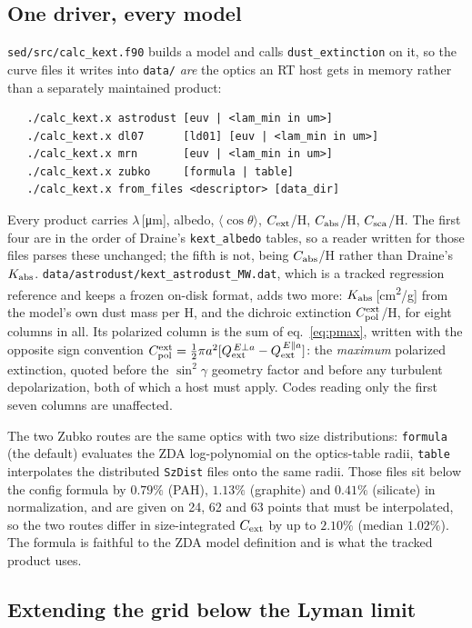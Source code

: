 \documentclass{my_memo}
\newcommand{\Qext}{\ensuremath{Q_{\rm ext}}}
\begin{document}
\subsection{One driver, every model}

\texttt{sed/src/calc\_kext.f90} builds a model and calls
\texttt{dust\_extinction} on it, so the curve files it writes into
\texttt{data/} \emph{are} the optics an RT host gets in memory rather
than a separately maintained product:
\begin{verbatim}
   ./calc_kext.x astrodust [euv | <lam_min in um>]
   ./calc_kext.x dl07      [ld01] [euv | <lam_min in um>]
   ./calc_kext.x mrn       [euv | <lam_min in um>]
   ./calc_kext.x zubko     [formula | table]
   ./calc_kext.x from_files <descriptor> [data_dir]
\end{verbatim}
Every product carries $\lambda$\,[\si{\micro\meter}], albedo,
$\langle\cos\theta\rangle$, $C_{\rm ext}$/H, $C_{\rm abs}$/H,
$C_{\rm sca}$/H. The first four are in the order of Draine's
\texttt{kext\_albedo} tables, so a reader written for those files parses
these unchanged; the fifth is not, being $C_{\rm abs}$/H rather than
Draine's $K_{\rm abs}$. \texttt{data/astrodust/kext\_astrodust\_MW.dat}, which is
a tracked regression reference and keeps a frozen on-disk format, adds
two more: $K_{\rm abs}$\,[\si{cm^2/g}] from the model's own dust mass
per H, and the dichroic extinction $C_{\rm pol}^{\rm ext}$/H, for eight
columns in all. Its polarized column is the sum of
eq.~\ref{eq:pmax}, written with the opposite sign convention
$C_{\rm pol}^{\rm ext} = \tfrac12\pi a^2[\Qext^{\,E\perp a} -
\Qext^{\,E\parallel a}]$: the \emph{maximum} polarized extinction,
quoted before the $\sin^2\gamma$ geometry factor and before any
turbulent depolarization, both of which a host must apply. Codes
reading only the first seven columns are unaffected.

The two Zubko routes are the same optics with two size distributions:
\texttt{formula} (the default) evaluates the ZDA log-polynomial on the
optics-table radii, \texttt{table} interpolates the distributed
\texttt{SzDist} files onto the same radii. Those files sit below the
config formula by $0.79\%$ (PAH), $1.13\%$ (graphite) and $0.41\%$
(silicate) in normalization, and are given on 24, 62 and 63 points that
must be interpolated, so the two routes differ in size-integrated
$C_{\rm ext}$ by up to $2.10\%$ (median $1.02\%$). The formula is
faithful to the ZDA model definition and is what the tracked product
uses.

\subsection{Extending the grid below the Lyman limit}
\end{document}
